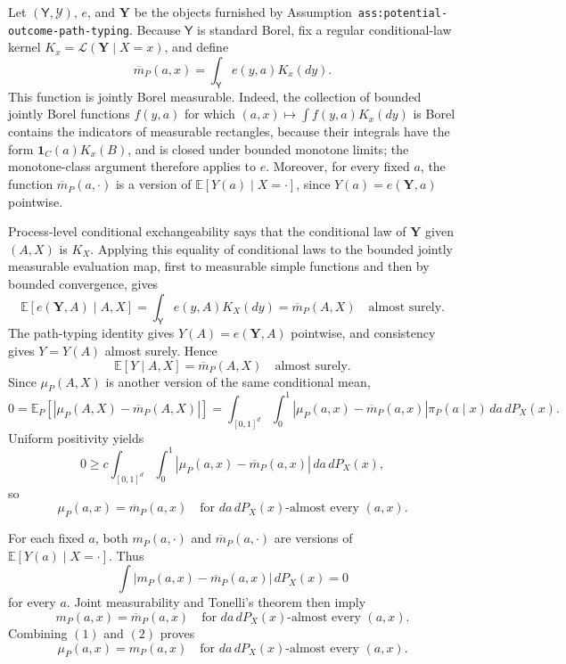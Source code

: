 Let \((\mathsf Y,\mathcal Y)\), \(e\), and \(\mathbf Y\) be the objects furnished by Assumption~\texttt{ass:potential-outcome-path-typing}. Because \(\mathsf Y\) is standard Borel, fix a regular conditional-law kernel \(K_x=\mathcal L(\mathbf Y\mid X=x)\), and define
\[
\overline m_P(a,x)=\int_{\mathsf Y}e(y,a)K_x(dy).
\]
This function is jointly Borel measurable. Indeed, the collection of bounded jointly Borel functions \(f(y,a)\) for which \((a,x)\mapsto\int f(y,a)K_x(dy)\) is Borel contains the indicators of measurable rectangles, because their integrals have the form \(\mathbf 1_C(a)K_x(B)\), and is closed under bounded monotone limits; the monotone-class argument therefore applies to \(e\). Moreover, for every fixed \(a\), the function \(\overline m_P(a,\cdot)\) is a version of \(\mathbb E[Y(a)\mid X=\cdot]\), since \(Y(a)=e(\mathbf Y,a)\) pointwise.

Process-level conditional exchangeability says that the conditional law of \(\mathbf Y\) given \((A,X)\) is \(K_X\). Applying this equality of conditional laws to the bounded jointly measurable evaluation map, first to measurable simple functions and then by bounded convergence, gives
\[
\mathbb E[e(\mathbf Y,A)\mid A,X]
=
\int_{\mathsf Y}e(y,A)K_X(dy)
=
\overline m_P(A,X)
\quad\text{almost surely}.
\]
The path-typing identity gives \(Y(A)=e(\mathbf Y,A)\) pointwise, and consistency gives \(Y=Y(A)\) almost surely. Hence
\[
\mathbb E[Y\mid A,X]=\overline m_P(A,X)
\quad\text{almost surely}.
\]
Since \(\mu_P(A,X)\) is another version of the same conditional mean,
\[
0
=
\mathbb E_P\!\left[\left|\mu_P(A,X)-\overline m_P(A,X)\right|\right]
=
\int_{[0,1]^d}\int_0^1
\left|\mu_P(a,x)-\overline m_P(a,x)\right|\pi_P(a\mid x)\,da\,dP_X(x).
\]
Uniform positivity yields
\[
0
\ge
c\int_{[0,1]^d}\int_0^1
\left|\mu_P(a,x)-\overline m_P(a,x)\right|\,da\,dP_X(x),
\]
so
\[
\mu_P(a,x)=\overline m_P(a,x)
\quad\text{for }da\,dP_X(x)\text{-almost every }(a,x). \tag{1}
\]

For each fixed \(a\), both \(m_P(a,\cdot)\) and \(\overline m_P(a,\cdot)\) are versions of \(\mathbb E[Y(a)\mid X=\cdot]\). Thus
\[
\int\left|m_P(a,x)-\overline m_P(a,x)\right|\,dP_X(x)=0
\]
for every \(a\). Joint measurability and Tonelli's theorem then imply
\[
m_P(a,x)=\overline m_P(a,x)
\quad\text{for }da\,dP_X(x)\text{-almost every }(a,x). \tag{2}
\]
Combining \((1)\) and \((2)\) proves
\[
\mu_P(a,x)=m_P(a,x)
\quad\text{for }da\,dP_X(x)\text{-almost every }(a,x).
\]

